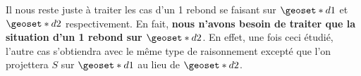 Il nous reste juste à traiter les cas d'un 1\ier{} rebond se faisant sur $\geoset*{d}{1}$ et $\geoset*{d}{2}$ respectivement. En fait, {\bfseries nous n'avons besoin de traiter que la situation d'un 1\ier{} rebond sur $\geoset*{d}{2}$}. En effet, une fois ceci étudié, l'autre cas s'obtiendra avec le même type de raisonnement excepté que l'on projettera $S$ sur $\geoset*{d}{1}$ au lieu de $\geoset*{d}{2}$. 
